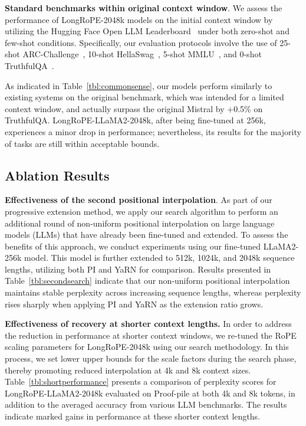 \textbf{Standard benchmarks within original context window}. We assess the performance of LongRoPE-2048k models on the initial context window by utilizing the Hugging Face Open LLM Leaderboard~\cite{huggingfaceboard} under both zero-shot and few-shot conditions. Specifically, our evaluation protocols involve the use of 25-shot ARC-Challenge~\cite{allenai:arc}, 10-shot HellaSwag~\cite{zellers2019hellaswag}, 5-shot MMLU~\cite{mmlu}, and 0-shot TruthfulQA~\cite{lin2021truthfulqa}.

As indicated in Table~\ref{tbl:commonsense}, our models perform similarly to existing systems on the original benchmark, which was intended for a limited context window, and actually surpass the original Mistral by +0.5\% on TruthfulQA. LongRoPE-LLaMA2-2048k, after being fine-tuned at 256k, experiences a minor drop in performance; nevertheless, its results for the majority of tasks are still within acceptable bounds.

\subsection{Ablation Results}

\textbf{Effectiveness of the second positional interpolation}. As part of our progressive extension method, we apply our search algorithm to perform an additional round of non-uniform positional interpolation on large language models (LLMs) that have already been fine-tuned and extended. To assess the benefits of this approach, we conduct experiments using our fine-tuned LLaMA2-256k model. This model is further extended to 512k, 1024k, and 2048k sequence lengths, utilizing both PI and YaRN for comparison. Results presented in Table~\ref{tbl:secondsearch} indicate that our non-uniform positional interpolation maintains stable perplexity across increasing sequence lengths, whereas perplexity rises sharply when applying PI and YaRN as the extension ratio grows.

\textbf{Effectiveness of recovery at shorter context lengths.} In order to address the reduction in performance at shorter context windows, we re-tuned the RoPE scaling parameters for LongRoPE-2048k using our search methodology. In this process, we set lower upper bounds for the scale factors during the search phase, thereby promoting reduced interpolation at 4k and 8k context sizes. Table~\ref{tbl:shortperformance} presents a comparison of perplexity scores for LongRoPE-LLaMA2-2048k evaluated on Proof-pile at both 4k and 8k tokens, in addition to the averaged accuracy from various LLM benchmarks. The results indicate marked gains in performance at these shorter context lengths.

